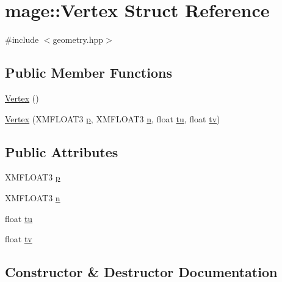 \hypertarget{structmage_1_1_vertex}{}\section{mage\+:\+:Vertex Struct Reference}
\label{structmage_1_1_vertex}


{\ttfamily \#include $<$geometry.\+hpp$>$}

\subsection*{Public Member Functions}
\begin{DoxyCompactItemize}
\item 
\hyperlink{structmage_1_1_vertex_a8bf3578fcb5595eab057dc2d1f916dce}{Vertex} ()
\item 
\hyperlink{structmage_1_1_vertex_a615029fe190db540ad0adb73b81ee8f5}{Vertex} (X\+M\+F\+L\+O\+A\+T3 \hyperlink{structmage_1_1_vertex_a9d726a508934b3baccfb01ea912420e7}{p}, X\+M\+F\+L\+O\+A\+T3 \hyperlink{structmage_1_1_vertex_a0b6c65dd92ba473f490e790189d92daf}{n}, float \hyperlink{structmage_1_1_vertex_a76d6a0ace40807f67c87e0dacd66da0d}{tu}, float \hyperlink{structmage_1_1_vertex_a08bf58ceae5197299c71204024b09ed2}{tv})
\end{DoxyCompactItemize}
\subsection*{Public Attributes}
\begin{DoxyCompactItemize}
\item 
X\+M\+F\+L\+O\+A\+T3 \hyperlink{structmage_1_1_vertex_a9d726a508934b3baccfb01ea912420e7}{p}
\item 
X\+M\+F\+L\+O\+A\+T3 \hyperlink{structmage_1_1_vertex_a0b6c65dd92ba473f490e790189d92daf}{n}
\item 
float \hyperlink{structmage_1_1_vertex_a76d6a0ace40807f67c87e0dacd66da0d}{tu}
\item 
float \hyperlink{structmage_1_1_vertex_a08bf58ceae5197299c71204024b09ed2}{tv}
\end{DoxyCompactItemize}


\subsection{Constructor \& Destructor Documentation}
\hypertarget{structmage_1_1_vertex_a8bf3578fcb5595eab057dc2d1f916dce}{}\label{structmage_1_1_vertex_a8bf3578fcb5595eab057dc2d1f916dce} 
